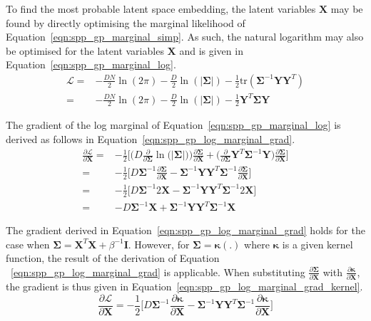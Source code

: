 To find the most probable latent space embedding, the latent variables \( \bm{X} \) may be 
found by directly optimising the marginal likelihood of Equation~\ref{eqn:spp_gp_marginal_simp}. 
As such, the natural logarithm may also be optimised for the latent variables \( \bm{X} \) and 
is given in Equation~\ref{eqn:spp_gp_marginal_log}.
\begin{align}
  \label{eqn:spp_gp_marginal_log}
  \mathcal{L} ={}& -\frac{DN}{2} \ln(2\pi)
  -\frac{D}{2} \ln(\left| \bm{\Sigma} \right|)
  -\frac{1}{2} \text{tr}(\bm{\Sigma}^{-1} \bm{YY}^{T})\\
  ={}& -\frac{DN}{2} \ln(2\pi)
  -\frac{D}{2} \ln(\left| \bm{\Sigma} \right|)
  -\frac{1}{2} \bm{Y}^{T}\bm{\Sigma}\bm{Y}
\end{align}

The gradient of the log marginal of Equation~\ref{eqn:spp_gp_marginal_log} 
is derived as follows in Equation~\ref{eqn:spp_gp_log_marginal_grad}.
\begin{align}
  \label{eqn:spp_gp_log_marginal_grad}
  \frac{\partial \mathcal{L}}{\partial \bm{X}} ={}&
  -\frac{1}{2} \Bigg[
    \Big( D \frac{\partial}{\partial \bm{\Sigma}} 
    \ln \big( \left| \bm{\Sigma} \right| \big) \Big) 
    \frac{\partial \bm{\Sigma}}{\partial \bm{X}}
    + \Big( \frac{\partial}{\partial \bm{\Sigma}}
    \bm{Y}^{T} \bm{\Sigma}^{-1} \bm{Y} \Big)
    \frac{\partial \bm{\Sigma}}{\partial \bm{X}}
  \Bigg]\\
  ={}& -\frac{1}{2} \Bigg[
    D \bm{\Sigma}^{-1} \frac{\partial \bm{\Sigma}}{\partial \bm{X}}
    - \bm{\Sigma}^{-1} \bm{YY}^{T} \bm{\Sigma}^{-1} 
    \frac{\partial \bm{\Sigma}}{\partial \bm{X}}
  \Bigg]\\
  ={}& -\frac{1}{2} \Bigg[
    D \bm{\Sigma}^{-1} 2 \bm{X}
    - \bm{\Sigma}^{-1} \bm{YY}^{T} \bm{\Sigma}^{-1} 2 \bm{X}
  \Bigg]\\
  ={}& -D \bm{\Sigma}^{-1} \bm{X}
  + \bm{\Sigma}^{-1} \bm{YY}^{T} \bm{\Sigma}^{-1} \bm{X}
\end{align}

The gradient derived in Equation~\ref{eqn:spp_gp_log_marginal_grad} holds 
for the case when \( \bm{\Sigma} = \bm{X}^{T}\bm{X} + \beta^{-1} \bm{I} \). 
However, for \( \bm{\Sigma} = \bm{\kappa}(.) \) where \( \bm{\kappa} \) is 
a given kernel function, the result of the derivation of Equation
~\ref{eqn:spp_gp_log_marginal_grad} is applicable. When substituting 
\( \frac{\partial \bm{\Sigma}}{\partial \bm{X}} \) with 
\( \frac{\partial \bm{\kappa}}{\partial \bm{X}} \), the gradient is thus 
given in Equation~\ref{eqn:spp_gp_log_marginal_grad_kernel}.
\begin{equation}
  \label{eqn:spp_gp_log_marginal_grad_kernel}
  \frac{\partial \mathcal{L}}{\partial \bm{X}} = 
  -\frac{1}{2} \Bigg[
    D \bm{\Sigma}^{-1} \frac{\partial \bm{\kappa}}{\partial \bm{X}}
    - \bm{\Sigma}^{-1} \bm{YY}^{T} \bm{\Sigma}^{-1} 
    \frac{\partial \bm{\kappa}}{\partial \bm{X}}
  \Bigg]
\end{equation}

